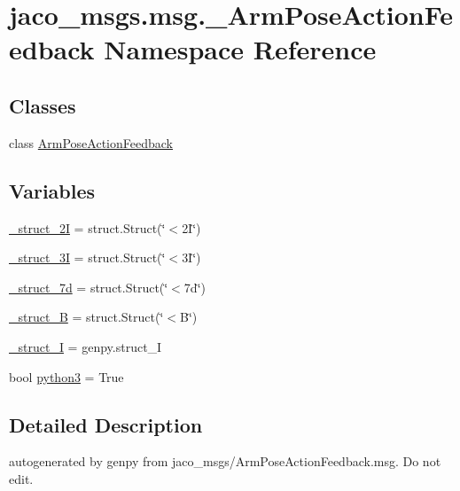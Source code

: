\hypertarget{namespacejaco__msgs_1_1msg_1_1__ArmPoseActionFeedback}{}\section{jaco\+\_\+msgs.\+msg.\+\_\+\+Arm\+Pose\+Action\+Feedback Namespace Reference}
\label{namespacejaco__msgs_1_1msg_1_1__ArmPoseActionFeedback}
\subsection*{Classes}
\begin{DoxyCompactItemize}
\item 
class \hyperlink{classjaco__msgs_1_1msg_1_1__ArmPoseActionFeedback_1_1ArmPoseActionFeedback}{Arm\+Pose\+Action\+Feedback}
\end{DoxyCompactItemize}
\subsection*{Variables}
\begin{DoxyCompactItemize}
\item 
\hyperlink{namespacejaco__msgs_1_1msg_1_1__ArmPoseActionFeedback_aa48a58e5004a45f5a3f85382b62ec89c}{\+\_\+struct\+\_\+2I} = struct.\+Struct(\char`\"{}$<$2\+I\char`\"{})
\item 
\hyperlink{namespacejaco__msgs_1_1msg_1_1__ArmPoseActionFeedback_a020cad3c1dd8ae7efcb3c56117774477}{\+\_\+struct\+\_\+3I} = struct.\+Struct(\char`\"{}$<$3\+I\char`\"{})
\item 
\hyperlink{namespacejaco__msgs_1_1msg_1_1__ArmPoseActionFeedback_a37be545af5b03727d162ecf7169b1394}{\+\_\+struct\+\_\+7d} = struct.\+Struct(\char`\"{}$<$7d\char`\"{})
\item 
\hyperlink{namespacejaco__msgs_1_1msg_1_1__ArmPoseActionFeedback_af00010c54ab6eb65770a8348e80d2808}{\+\_\+struct\+\_\+B} = struct.\+Struct(\char`\"{}$<$B\char`\"{})
\item 
\hyperlink{namespacejaco__msgs_1_1msg_1_1__ArmPoseActionFeedback_a30335b0d3e3a23c118236a2c04510428}{\+\_\+struct\+\_\+I} = genpy.\+struct\+\_\+I
\item 
bool \hyperlink{namespacejaco__msgs_1_1msg_1_1__ArmPoseActionFeedback_a78b080e28ea04ed9c4896819b6476aa3}{python3} = True
\end{DoxyCompactItemize}


\subsection{Detailed Description}
\begin{DoxyVerb}autogenerated by genpy from jaco_msgs/ArmPoseActionFeedback.msg. Do not edit.\end{DoxyVerb}
 

